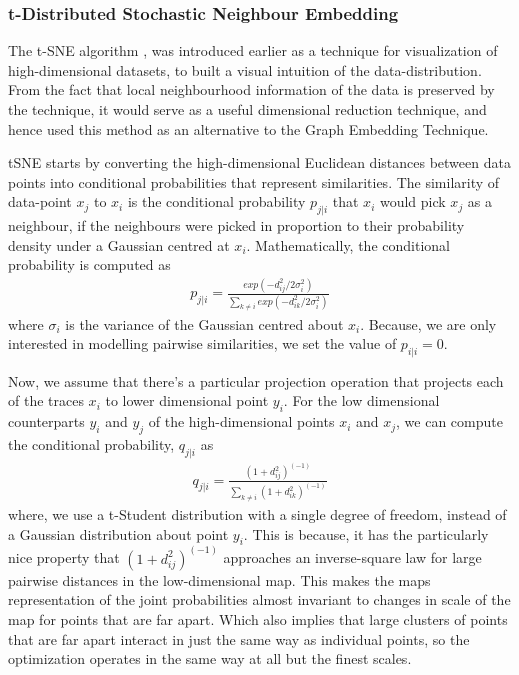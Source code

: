 \documentclass[10pt]{article}
\begin{document}
\subsubsection{t-Distributed Stochastic Neighbour Embedding}
The t-SNE algorithm \cite{tSNEdataViz}, was introduced earlier as a technique for visualization of high-dimensional datasets, to built a visual intuition of the data-distribution. From the fact that local neighbourhood information of the data is preserved by the technique, it would serve as a useful dimensional reduction technique, and hence used this method as an alternative to the Graph Embedding Technique.

tSNE starts by converting the high-dimensional Euclidean distances between data points  into conditional probabilities that represent similarities. The similarity of data-point $x_j$ to $x_i$ is the conditional probability $p_{j|i}$ that $x_i$ would pick $x_j$ as a neighbour, if the neighbours were picked in proportion to their probability density under a Gaussian centred at $x_i$. Mathematically, the conditional probability is computed as
\begin{align}
p_{j|i} = \frac{exp( - d_{ij}^2/ 2\sigma_i^2)}{\sum_{k \ne i} exp( - d_{ik}^2/ 2\sigma_i^2)}\label{eq:prob_nbr_HD}
\end{align} where $\sigma_i$ is the variance of the Gaussian centred about $x_i$. Because, we are only interested  in modelling pairwise similarities, we set the value of $p_{i|i} = 0$.

Now, we assume that there's a particular projection operation that projects each of the traces $x_i$ to lower dimensional point $y_i$. For the low dimensional counterparts $y_i$ and $y_j$ of the high-dimensional points $x_i$ and $x_j$, we can compute the conditional probability, $q_{j|i}$ as 
\begin{align}
q_{j|i} = \frac{(1 + d_{ij}^2)^(-1)}{\sum_{k \ne i} (1 + d_{ik}^2)^(-1)}
\end{align}
where, we use a t-Student distribution with a single degree of freedom, instead of a Gaussian distribution about point $y_i$. This is because, it has the particularly nice property that $(1 + d_{ij}^2)^(-1)$ approaches an inverse-square law for large pairwise distances in the low-dimensional map. This makes the maps representation of the joint probabilities almost invariant to changes in scale of the map for points that are far apart. Which also implies that large clusters of points that are far apart interact in just the same way as individual points, so the optimization operates in the same way at all but the finest scales. 
\end{document}
